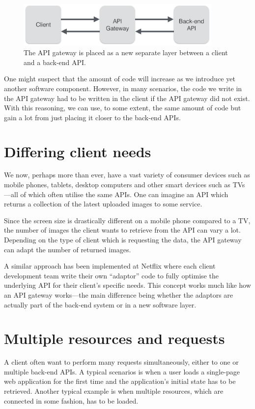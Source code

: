 \documentclass{cslthse-msc}
\begin{document}
\begin{figure}[H]
  \centering
    \begin{center}
      \includegraphics[width=0.9\textwidth]{images/api_gateway.png}
    \end{center}
  \caption{The API gateway is placed as a new separate layer between a client and a back-end API.}
\end{figure}

One might suspect that the amount of code will increase as we introduce yet another software component. However, in many scenarios, the code we write in the API gateway had to be written in the client if the API gateway did not exist. With this reasoning, we can use, to some extent, the same amount of code but gain a lot from just placing it closer to the back-end APIs.

\section{Differing client needs}
We now, perhaps more than ever, have a vast variety of consumer devices such as mobile phones, tablets, desktop computers and other smart devices such as TVs---all of which often utilise the same APIs. One can imagine an API which returns a collection of the latest uploaded images to some service. 

Since the screen size is drastically different on a mobile phone compared to a TV, the number of images the client wants to retrieve from the API can vary a lot. Depending on the type of client which is requesting the data, the API gateway can adapt the number of returned images.

A similar approach has been implemented at Netflix where each client development team write their own \enquote{adaptor} code to fully optimise the underlying API for their client's specific needs\cite{netflix}. This concept works much like how an API gateway works---the main difference being whether the adaptors are actually part of the back-end system or in a new software layer.

\section{Multiple resources and requests}
A client often want to perform many requests simultaneously, either to one or multiple back-end APIs. A typical scenarios is when a user loads a single-page web application for the first time and the application's initial state has to be retrieved. Another typical example is when multiple resources, which are connected in some fashion, has to be loaded.
\end{document}
